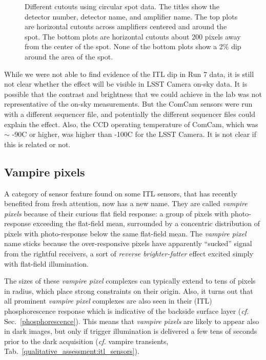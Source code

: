 \begin{figure}[ht]
\caption{Different cutouts using circular spot data. The titles show the detector number, detector name, and amplifier name. The top plots are horizontal cutouts across amplifiers centered and around the spot. The bottom plots are horizontal cutouts about 200 pixels away from the center of the spot. None of the bottom plots show a 2\% dip around the area of the spot.}
\label{fig:ITLDip_Spots}
\end{figure}

While we were not able to find evidence of the ITL dip in Run 7 data, it
is still not clear whether the effect will be visible in LSST Camera on-sky data. It is possible that the contrast and brightness that we could achieve in the lab was not representative of the on-sky measurements. But the ComCam sensors were run with a different sequencer file, and potentially the different sequencer files could explain the effect. Also, the CCD operating temperature of ComCam, which was $\sim$ -90C or higher, was higher than -100C for the LSST Camera. It is not clear if this is related or not.

\clearpage

\subsection{Vampire pixels}\label{vampire-pixels}

A category of sensor feature found on some ITL sensors, that has recently benefited from fresh attention, now has a new name. They are called {\it vampire pixels} because of their curious flat field response: a group of pixels with photo-response exceeding the flat-field mean, surrounded by a concentric distribution of pixels with photo-response below the same flat-field mean. The {\it vampire pixel} name sticks because the over-responsive pixels have apparently ``sucked'' signal from the rightful receivers, a sort of {\it reverse brighter-fatter} effect excited simply with flat-field illumination. 

The sizes of these {\it vampire pixel} complexes can typically extend to tens of pixels in radius, which place strong constraints on their origin. Also, it turns out that all prominent {\it vampire pixel} complexes are also seen in their (ITL) phosphorescence response which is indicative of the backside surface layer ({\it cf.} Sec.~\ref{phosphorescence}). This means that {\it vampire pixels} are likely to appear also in dark images, but only if trigger illumination is delivered a few tens of seconds prior to the dark acquisition ({\it cf.} vampire transients, Tab.~\ref{qualitative_assessment:itl_sensors}).

